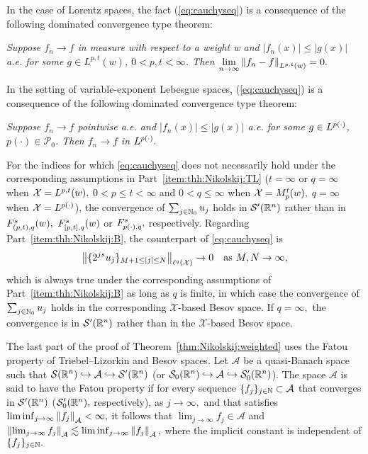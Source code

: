  In the case of Lorentz spaces, the fact (\ref{eq:cauchyseq}) is  a consequence of the following dominated convergence type theorem:

\noindent \textit{Suppose $f_n \rightarrow f$ in measure with respect to a weight w and $|f_n (x)| \leq |g(x)|$ a.e. for some $g\in L^{p,t}(w)$, $0<p,t<\infty$. Then $\lim\limits_{n\rightarrow\infty} \norm{f_n-f}{L^{p,t}(w)} = 0.$
}

In the setting of variable-exponent Lebesgue spaces, (\ref{eq:cauchyseq}) is  a consequence of the following dominated convergence type theorem:

\noindent \textit{Suppose $f_n \rightarrow f$ pointwise a.e. and $|f_n (x)| \leq |g(x)|$ a.e. for some $g\in \Lp$, $p(\cdot) \in \mathcal{P}_0$. Then $f_n \rightarrow f$ in $\Lp.$}


For the indices for which \eqref{eq:cauchyseq} does not necessarily hold under the corresponding assumptions in Part~\eqref{item:thh:Nikolskij:TL} ($t=\infty$ or $q=\infty$ when  $\mathcal{X}=\lebw{p,t}{w},$ $0<p\le t<\infty$ and $0<q\le \infty$ when  $\mathcal{X}=\mow{p}{t}{w},$ $q=\infty$ when  $\mathcal{X}=\Lp$), the convergence of $\sum_{j\in\naz} u_j$ holds in $\swp$ rather than in  $\itlw{(p,t)}{s}{q}{w},$ $\itlw{[p,t]}{s}{q}{w}$ or  $\itl{\pp}{s}{q},$ respectively. Regarding Part~\eqref{item:thh:Nikolskij:B}, the counterpart of \eqref{eq:cauchyseq} is
\begin{equation*}
\norm{\{2^{js} u_j\}_{M+1\le \abs{j}\le N}}{\ell^q(\mathcal{X})}\to 0\quad \text{as }M,N\to\infty,
\end{equation*}
which is always true under the corresponding assumptions of Part~\eqref{item:thh:Nikolskij:B} as long as $q$ is finite, in which case the convergence of $\sum_{j\in\naz} u_j$ holds in the corresponding $\mathcal{X}$-based Besov space. If $q=\infty,$ the convergence is in $\swp$ rather than in the $\mathcal{X}$-based Besov space.

The last part of the proof of Theorem~\ref{thm:Nikolskij:weighted} uses the Fatou property of Triebel--Lizorkin and Besov spaces.  Let  $\mathcal{A}$ be a quasi-Banach space such that $\sw\hookrightarrow\mathcal{A}\hookrightarrow\swp$ (or $\swz\hookrightarrow\mathcal{A}\hookrightarrow\mathcal{S}_0'(\rn)$). The space $\mathcal{A}$ is said to  have the Fatou property if  for every sequence $\{f_j\}_{j\in \na}\subset \mathcal{A}$ that converges in $\swp$ ($\mathcal{S}_0'(\rn),$  respectively), as $j\to \infty,$ and that satisfies $\liminf_{j\to\infty} \norm{f_j}{\mathcal{A}}<\infty,$ it follows that $\lim_{j\to\infty}f_j\in \mathcal{A}$ and $\norm{\lim_{j\to\infty}f_j}{\mathcal{A}}\lesssim \liminf_{j\to\infty} \norm{f_j}{\mathcal{A}},$ where the implicit constant is independent of $\{f_j\}_{j\in\na}.$ 

